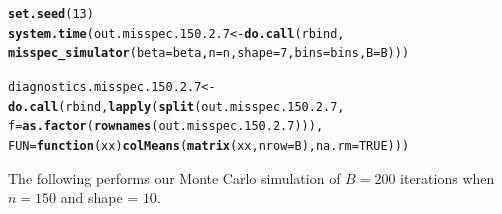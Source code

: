 \documentclass[11pt]{article}\usepackage[]{graphicx}\usepackage[]{color}
\makeatletter
\newcommand{\hlnum}[1]{\textcolor[rgb]{0.686,0.059,0.569}{#1}}%
\newcommand{\hlstd}[1]{\textcolor[rgb]{0.345,0.345,0.345}{#1}}%
\newcommand{\hlkwa}[1]{\textcolor[rgb]{0.161,0.373,0.58}{\textbf{#1}}}%
\newcommand{\hlkwb}[1]{\textcolor[rgb]{0.69,0.353,0.396}{#1}}%
\newcommand{\hlkwc}[1]{\textcolor[rgb]{0.333,0.667,0.333}{#1}}%
\newcommand{\hlkwd}[1]{\textcolor[rgb]{0.737,0.353,0.396}{\textbf{#1}}}%
\newenvironment{kframe}{%
 \def\at@end@of@kframe{}%
 \ifinner\ifhmode%
  \def\at@end@of@kframe{\end{minipage}}%
  \begin{minipage}{\columnwidth}%
 \fi\fi%
 \def\FrameCommand##1{\hskip\@totalleftmargin \hskip-\fboxsep
 \colorbox{shadecolor}{##1}\hskip-\fboxsep
     \hskip-\linewidth \hskip-\@totalleftmargin \hskip\columnwidth}%
 \MakeFramed {\advance\hsize-\width
   \@totalleftmargin\z@ \linewidth\hsize
   \@setminipage}}%
 {\par\unskip\endMakeFramed%
 \at@end@of@kframe}
\newenvironment{knitrout}{}{} %
\makeatother
\begin{document}
\begin{knitrout}
\color{fgcolor}\begin{kframe}
\begin{alltt}
\hlkwd{set.seed}\hlstd{(}\hlnum{13}\hlstd{)}
\hlkwd{system.time}\hlstd{(out.misspec.150.2.7} \hlkwb{<-} \hlkwd{do.call}\hlstd{(rbind,}
  \hlkwd{misspec_simulator}\hlstd{(}\hlkwc{beta} \hlstd{= beta,} \hlkwc{n} \hlstd{= n,} \hlkwc{shape} \hlstd{=} \hlnum{7}\hlstd{,} \hlkwc{bins} \hlstd{= bins,} \hlkwc{B} \hlstd{= B)))}
\end{alltt}


{\ttfamily\noindent\bfseries\color{errorcolor}{\#\# Error in chol.default(crossprod(x) + lambda[j] * diag(v)): the leading minor of order 5 is not positive definite}}

{\ttfamily\noindent\itshape\color{messagecolor}{\#\# Timing stopped at: 0.764 0 0.763}}\begin{alltt}
\hlstd{diagnostics.misspec.150.2.7} \hlkwb{<-} \hlkwd{do.call}\hlstd{(rbind,} \hlkwd{lapply}\hlstd{(}\hlkwd{split}\hlstd{(out.misspec.150.2.7,}
  \hlkwc{f} \hlstd{=} \hlkwd{as.factor}\hlstd{(}\hlkwd{rownames}\hlstd{(out.misspec.150.2.7))),}
  \hlkwc{FUN} \hlstd{=} \hlkwa{function}\hlstd{(}\hlkwc{xx}\hlstd{)} \hlkwd{colMeans}\hlstd{(}\hlkwd{matrix}\hlstd{(xx,} \hlkwc{nrow} \hlstd{= B),} \hlkwc{na.rm} \hlstd{=} \hlnum{TRUE}\hlstd{)))}
\end{alltt}


{\ttfamily\noindent\bfseries\color{errorcolor}{\#\# Error in split(out.misspec.150.2.7, f = as.factor(rownames(out.misspec.150.2.7))): object 'out.misspec.150.2.7' not found}}\end{kframe}
\end{knitrout}


The following performs our Monte Carlo simulation of $B = 200$ iterations 
when $n = 150$ and shape = $10$.
\end{document}
